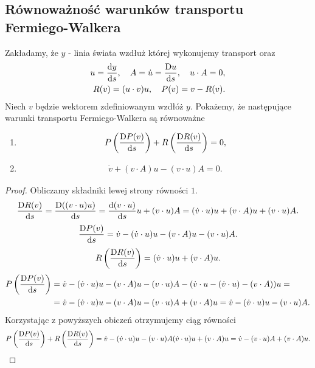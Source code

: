 \subsection{Równoważność warunków transportu 
Fermiego-Walkera}
\noindent
Zakładamy, że $y$ - linia świata wzdłuż której 
wykonujemy transport oraz 
\begin{align*}
u = \frac{\text{d} y}{\text{d} s}, \quad A = \dot{u} = \frac{\text{D} u}{\text{d} s}, 
\quad u\cdot A = 0,\\
R(v) = (u\cdot v) u, \quad  P(v) = v - R(v).
\end{align*}
Niech $v$ będzie wektorem zdefiniowanym wzdłóż $y$. 
Pokażemy, że następujące warunki transportu Fermiego-Walkera są 
równoważne
\begin{enumerate}
\item
\begin{align*} 
P \left(\frac{\text{D} P(v)}{\text{d} s} \right) +
R \left( \frac{\text{D} R(v)}{\text{d} s} \right) =0,
\end{align*}
\item
\begin{align*} 
 \dot{v} +
(v\cdot A) u - (v\cdot u) A =0 .
\end{align*}
\end{enumerate}
\begin{proof}
Obliczamy składniki lewej strony równości $1$.
\begin{align*}
 \frac{\text{D} R(v)}{\text{d} s} = 
\frac{\text{D} ((v\cdot u)u)}{\text{d} s} =
\frac{\text{d} (v\cdot u)}{\text{d} s} u + (v\cdot u) A =
(\dot{v}\cdot u) u + (v\cdot A) u + (v\cdot u) A .
\end{align*}
\begin{align*}
\frac{\text{D} P(v)}{\text{d} s}  = 
 \dot{v} -(\dot{v}\cdot u) u - (v\cdot A) u - (v\cdot u) A .
\end{align*}
\begin{align*}
R \left( \frac{\text{D} R(v)}{\text{d} s} \right) =
(\dot{v}\cdot u) u + (v\cdot A) u .
\end{align*}
\begin{align*}
P \left(\frac{\text{D} P(v)}{\text{d} s} \right) &= 
 \dot{v} -
(\dot{v}\cdot u) u - (v\cdot A) u - (v\cdot u) A -
( \dot{v}\cdot u - (\dot{v}\cdot u)- (v\cdot A) )u = \\
&=
 \dot{v} -
(\dot{v}\cdot u) u - (v\cdot A) u - (v\cdot u) A 
+ (v\cdot A) u = 
 \dot{v} -
(\dot{v}\cdot u) u  - (v\cdot u) A .
\end{align*}
Korzystając z powyższych obiczeń otrzymujemy ciąg równości 
\begin{align*}
P \left(\frac{\text{D} P(v)}{\text{d} s} \right) +
R \left( \frac{\text{D} R(v)}{\text{d} s} \right) = 
 \dot{v} -
(\dot{v}\cdot u) u  - (v\cdot u) A 
(\dot{v}\cdot u) u + (v\cdot A) u  = 
 \dot{v} 
 - (v\cdot u) A 
 + (v\cdot A) u  .
\end{align*}

\end{proof}



